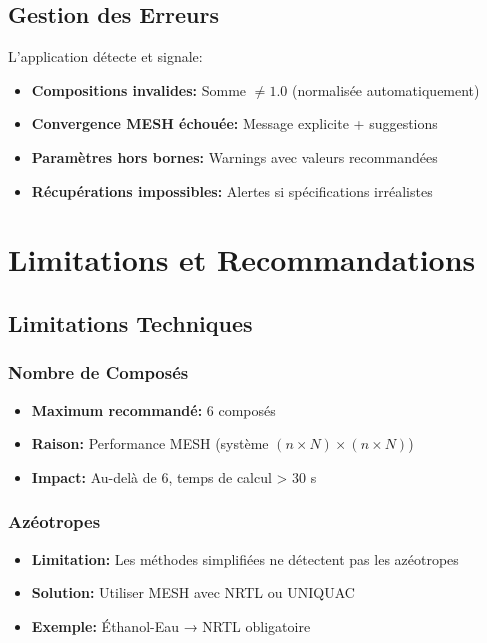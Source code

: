 \documentclass[11pt,a4paper]{article}
\begin{document}
\subsection{Gestion des Erreurs}

L'application détecte et signale:

\begin{itemize}[leftmargin=*]
    \item \textbf{Compositions invalides:} Somme $\neq 1.0$ (normalisée automatiquement)
    \item \textbf{Convergence MESH échouée:} Message explicite + suggestions
    \item \textbf{Paramètres hors bornes:} Warnings avec valeurs recommandées
    \item \textbf{Récupérations impossibles:} Alertes si spécifications irréalistes
\end{itemize}

\section{Limitations et Recommandations}

\subsection{Limitations Techniques}

\subsubsection{Nombre de Composés}

\begin{itemize}[leftmargin=*]
    \item \textbf{Maximum recommandé:} 6 composés
    \item \textbf{Raison:} Performance MESH (système $(n \times N) \times (n \times N)$)
    \item \textbf{Impact:} Au-delà de 6, temps de calcul > 30 s
\end{itemize}

\subsubsection{Azéotropes}

\begin{itemize}[leftmargin=*]
    \item \textbf{Limitation:} Les méthodes simplifiées ne détectent pas les azéotropes
    \item \textbf{Solution:} Utiliser MESH avec NRTL ou UNIQUAC
    \item \textbf{Exemple:} Éthanol-Eau → NRTL obligatoire
\end{itemize}
\end{document}
